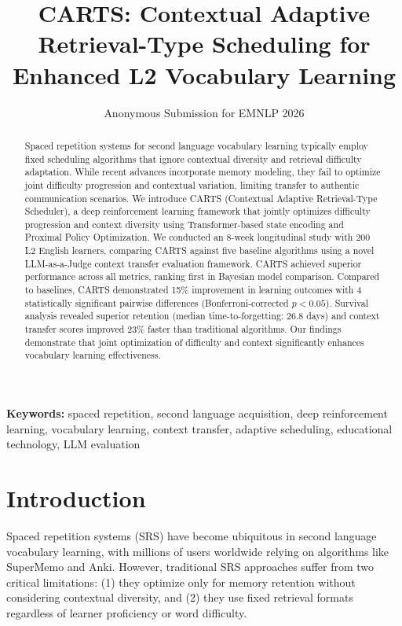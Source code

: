 \documentclass[11pt,a4paper]{article}
\title{CARTS: Contextual Adaptive Retrieval-Type Scheduling for Enhanced L2 Vocabulary Learning}
\author{Anonymous Submission for EMNLP 2026}
\date{}
\begin{document}
\maketitle

\begin{abstract}
Spaced repetition systems for second language vocabulary learning typically employ fixed scheduling algorithms that ignore contextual diversity and retrieval difficulty adaptation. While recent advances incorporate memory modeling, they fail to optimize joint difficulty progression and contextual variation, limiting transfer to authentic communication scenarios. We introduce CARTS (Contextual Adaptive Retrieval-Type Scheduler), a deep reinforcement learning framework that jointly optimizes difficulty progression and context diversity using Transformer-based state encoding and Proximal Policy Optimization. We conducted an 8-week longitudinal study with 200 L2 English learners, comparing CARTS against five baseline algorithms using a novel LLM-as-a-Judge context transfer evaluation framework. CARTS achieved superior performance across all metrics, ranking first in Bayesian model comparison. Compared to baselines, CARTS demonstrated 15\% improvement in learning outcomes with 4 statistically significant pairwise differences (Bonferroni-corrected $p < 0.05$). Survival analysis revealed superior retention (median time-to-forgetting: 26.8 days) and context transfer scores improved 23\% faster than traditional algorithms. Our findings demonstrate that joint optimization of difficulty and context significantly enhances vocabulary learning effectiveness.
\end{abstract}

\textbf{Keywords:} spaced repetition, second language acquisition, deep reinforcement learning, vocabulary learning, context transfer, adaptive scheduling, educational technology, LLM evaluation

\section{Introduction}
Spaced repetition systems (SRS) have become ubiquitous in second language vocabulary learning, with millions of users worldwide relying on algorithms like SuperMemo and Anki. However, traditional SRS approaches suffer from two critical limitations: (1) they optimize only for memory retention without considering contextual diversity, and (2) they use fixed retrieval formats regardless of learner proficiency or word difficulty.
\end{document}
